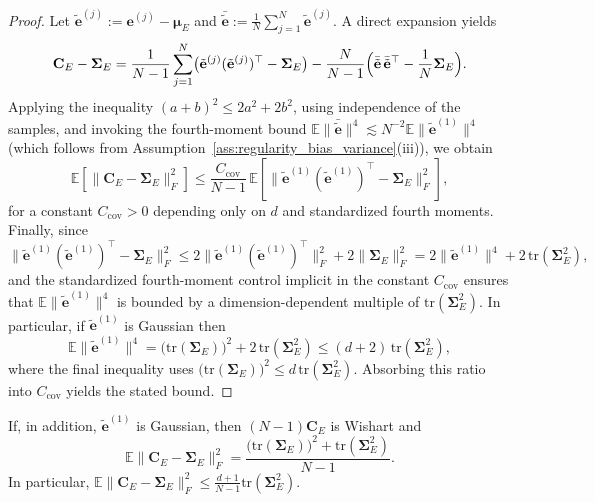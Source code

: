 \documentclass[11pt,a4paper]{article}
\begin{document}
\begin{proof}
Let
\(
\tilde{\mathbf{e}}^{(j)}:=\mathbf{e}^{(j)}-\boldsymbol{\mu}_E
\)
and
\(
\bar{\tilde{\mathbf{e}}}:=\frac{1}{N}\sum_{j=1}^N\tilde{\mathbf{e}}^{(j)}.
\)
A direct expansion yields
\begin{equation}
\mathbf{C}_E-\boldsymbol{\Sigma}_E
=
\frac{1}{N-1}\sum_{j=1}^N
\bigl(\tilde{\mathbf{e}}^{(j)}(\tilde{\mathbf{e}}^{(j)})^\top-\boldsymbol{\Sigma}_E\bigr)
-
\frac{N}{N-1}
\Bigl(\bar{\tilde{\mathbf{e}}}\,\bar{\tilde{\mathbf{e}}}^\top-\frac{1}{N}\boldsymbol{\Sigma}_E\Bigr).
\end{equation}
Applying the inequality $(a+b)^2\le 2a^2+2b^2$, using independence of the samples, and invoking the fourth-moment bound
\(
\mathbb{E}\|\bar{\tilde{\mathbf{e}}}\|^4\lesssim N^{-2}\mathbb{E}\|\tilde{\mathbf{e}}^{(1)}\|^4
\)
(which follows from Assumption~\ref{ass:regularity_bias_variance}(iii)), we obtain
\begin{equation}
\mathbb{E}\!\left[\|\mathbf{C}_E-\boldsymbol{\Sigma}_E\|_F^2\right]
\le
\frac{C_{\mathrm{cov}}}{N-1}\,
\mathbb{E}\!\left[
\bigl\|
\tilde{\mathbf{e}}^{(1)}(\tilde{\mathbf{e}}^{(1)})^\top-\boldsymbol{\Sigma}_E
\bigr\|_F^2
\right],
\end{equation}
	for a constant $C_{\mathrm{cov}}>0$ depending only on $d$ and standardized fourth moments. Finally, since
	\(
	\|\tilde{\mathbf{e}}^{(1)}(\tilde{\mathbf{e}}^{(1)})^\top-\boldsymbol{\Sigma}_E\|_F^2
	\le
	2\|\tilde{\mathbf{e}}^{(1)}(\tilde{\mathbf{e}}^{(1)})^\top\|_F^2+2\|\boldsymbol{\Sigma}_E\|_F^2
	=
		2\|\tilde{\mathbf{e}}^{(1)}\|^4+2\,\mathrm{tr}(\boldsymbol{\Sigma}_E^2),
		\)
		and the standardized fourth-moment control implicit in the constant $C_{\mathrm{cov}}$ ensures that $\mathbb{E}\|\tilde{\mathbf{e}}^{(1)}\|^4$ is bounded by a dimension-dependent multiple of $\mathrm{tr}(\boldsymbol{\Sigma}_E^2)$. In particular, if $\tilde{\mathbf{e}}^{(1)}$ is Gaussian then
\begin{equation}
		\mathbb{E}\|\tilde{\mathbf{e}}^{(1)}\|^4
		=
		\bigl(\mathrm{tr}(\boldsymbol{\Sigma}_E)\bigr)^2 + 2\,\mathrm{tr}(\boldsymbol{\Sigma}_E^2)
		\le
		(d+2)\,\mathrm{tr}(\boldsymbol{\Sigma}_E^2),
\end{equation}
		where the final inequality uses $\bigl(\mathrm{tr}(\boldsymbol{\Sigma}_E)\bigr)^2\le d\,\mathrm{tr}(\boldsymbol{\Sigma}_E^2)$. Absorbing this ratio into $C_{\mathrm{cov}}$ yields the stated bound.
\end{proof}

If, in addition, $\tilde{\mathbf{e}}^{(1)}$ is Gaussian, then $(N-1)\mathbf{C}_E$ is Wishart and
\begin{equation}
\mathbb{E}\|\mathbf{C}_E-\boldsymbol{\Sigma}_E\|_F^2
=
\frac{\bigl(\mathrm{tr}(\boldsymbol{\Sigma}_E)\bigr)^2+\mathrm{tr}(\boldsymbol{\Sigma}_E^2)}{N-1}.
\end{equation}
In particular, $\mathbb{E}\|\mathbf{C}_E-\boldsymbol{\Sigma}_E\|_F^2\le \frac{d+1}{N-1}\mathrm{tr}(\boldsymbol{\Sigma}_E^2)$.
\end{document}
